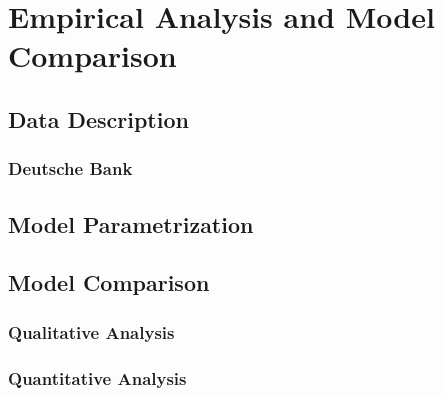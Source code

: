 \chapter{Empirical Analysis and Model Comparison}\label{empiricalanalysis}

\section{Data Description}

\subsection{Deutsche Bank}

\section{Model Parametrization}

\section{Model Comparison}

\subsection{Qualitative Analysis}

\subsection{Quantitative Analysis}